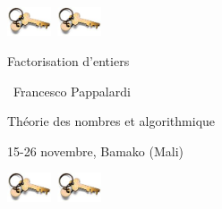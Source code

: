 \documentclass[landscape]{powersem} %
\begin{document}

\begin{slide}
\addtocounter{slide}{-1}
\includegraphics[width=1.3cm]{images/crypto.jpg}\ \hfill \includegraphics[width=1.3cm]{images/crypto.jpg}
\vfil

\begin{sc}\begin{center}
\begin{Large}

\textcolor{underlcolor}{Factorisation d'entiers}
\end{Large}\bigskip

\ {Francesco Pappalardi}\bigskip\bigskip

\begin{large}\begin{bf}Th\'eorie des nombres et algorithmique
\end{bf}\end{large}\medskip

15-26 novembre, Bamako (Mali)\medskip


\end{center}
\end{sc}
\vfill

\includegraphics[width=1.3cm]{images/crypto.jpg}\ \hfill \includegraphics[width=1.3cm]{images/crypto.jpg}
\end{slide}
\end{document}
